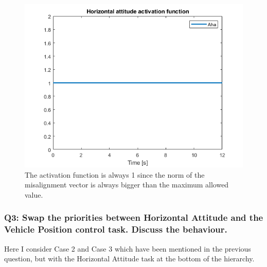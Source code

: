 \documentclass{article}
\begin{document}
\begin{figure}[H]
	\centering
	\includegraphics[width=0.7\linewidth]{images/Ex1/HorAtt_Enabled_DifferentStartpos_DifferentEndpos_ActivFunct}
	\caption{The activation function is always 1 since the norm of the misalignment vector is always bigger than the maximum allowed value.}
	\label{fig:q2case3d}
\end{figure}


\subsubsection{Q3: Swap the priorities between Horizontal Attitude and the Vehicle Position control task. Discuss the behaviour.}
Here I consider Case 2 and Case 3 which have been mentioned in the previous question, but with the Horizontal Attitude task at the bottom of the hierarchy. \\
\end{document}
